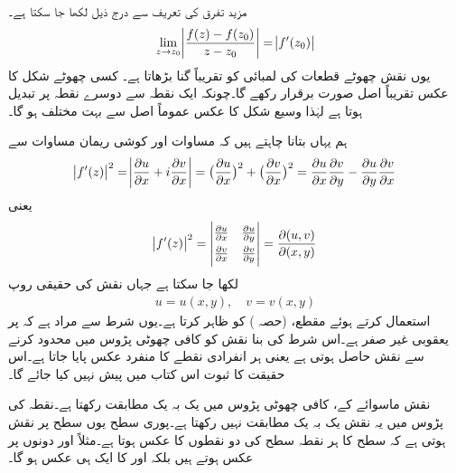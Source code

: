 مزید  تفرق کی تعریف سے  درج ذیل لکھا جا سکتا ہے۔
\begin{align*}
\lim_{z\to z_0} \abs{\frac{f(z)-f(z_0)}{z-z_0}}=\abs{f'(z_0)}
\end{align*} 
یوں نقش  چھوٹے قطعات کی لمبائی کو تقریباً  گنا بڑھاتا ہے۔ کسی چھوٹے شکل کا عکس تقریباً اصل صورت برقرار رکھے گا۔چونکہ  ایک نقطہ سے دوسرے نقطہ پر تبدیل ہوتا ہے لہٰذا وسیع شکل کا عکس عموماً اصل سے بہت مختلف ہو گا۔ 

ہم یہاں بتانا چاہتے ہیں کہ مساوات  اور کوشی ریمان مساوات سے
\begin{align}\label{مساوات_نقش_عمومی_منحنی_ٹ}
\abs{f'(z)}^2=\abs{\frac{\partial u}{\partial x}+i\frac{\partial v}{\partial x}}=\big(\frac{\partial u}{\partial x}\big)^2+\big(\frac{\partial v}{\partial x}\big)^2=\frac{\partial u}{\partial x}\frac{\partial v}{\partial y}-\frac{\partial u}{\partial y}\frac{\partial v}{\partial x}
\end{align}
یعنی
\begin{align}\label{مساوات_نقش_عمومی_منحنی_ث}
\abs{f'(z)}^2=
\begin{vmatrix}
\frac{\partial u}{\partial x}&\frac{\partial u}{\partial y}\\[1ex]
\frac{\partial v}{\partial x}&\frac{\partial v}{\partial y}
\end{vmatrix}=
\frac{\partial(u,v)}{\partial(x,y)}
\end{align}
لکھا جا سکتا ہے جہاں نقش  کی حقیقی روپ
\begin{align*}
u=u(x,y),\quad v=v(x,y)
\end{align*}
استعمال کرتے ہوئے  مقطع،  (حصہ ) کو ظاہر کرتا ہے۔یوں شرط  سے مراد ہے کہ  پر یعقوبی غیر صفر ہے۔اس شرط کی بنا نقش  کو کافی چھوٹی پڑوس میں محدود کرنے سے  نقش حاصل ہوتی ہے یعنی ہر انفرادی نقطے کا منفرد عکس پایا جاتا ہے۔اس حقیقت کا ثبوت اس کتاب میں پیش نہیں کیا جائے گا۔ 

\quad
نقش  ماسوائے  کے، کافی چھوٹی پڑوس میں یک بہ یک مطابقت رکھتا ہے۔نقطہ  کی پڑوس میں یہ نقش یک بہ یک مطابقت نہیں رکھتا ہے۔پوری  سطح یوں  سطح پر نقش ہوتی ہے کہ  سطح کا ہر نقطہ   سطح  کی دو نقطوں کا عکس ہوتا ہے۔مثلاً  اور  دونوں  پر عکس ہوتے ہیں بلکہ  اور  کا ایک ہی عکس  ہو گا۔

